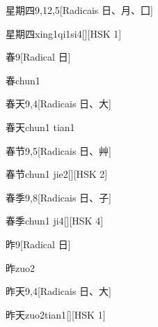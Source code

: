 \begin{entry}{星期四}{9,12,5}[Radicais ⽇、⽉、⼞]
  \begin{phonetics}{星期四}{xing1qi1si4}[][HSK 1]
  \end{phonetics}
\end{entry}

\begin{entry}{春}{9}[Radical ⽇]
  \begin{phonetics}{春}{chun1}
  \end{phonetics}
\end{entry}

\begin{entry}{春天}{9,4}[Radicais ⽇、⼤]
  \begin{phonetics}{春天}{chun1 tian1}
  \end{phonetics}
\end{entry}

\begin{entry}{春节}{9,5}[Radicais ⽇、⾋]
  \begin{phonetics}{春节}{chun1 jie2}[][HSK 2]
  \end{phonetics}
\end{entry}

\begin{entry}{春季}{9,8}[Radicais ⽇、⼦]
  \begin{phonetics}{春季}{chun1 ji4}[][HSK 4]
  \end{phonetics}
\end{entry}

\begin{entry}{昨}{9}[Radical ⽇]
  \begin{phonetics}{昨}{zuo2}
  \end{phonetics}
\end{entry}

\begin{entry}{昨天}{9,4}[Radicais ⽇、⼤]
  \begin{phonetics}{昨天}{zuo2tian1}[][HSK 1]
  \end{phonetics}
\end{entry}

